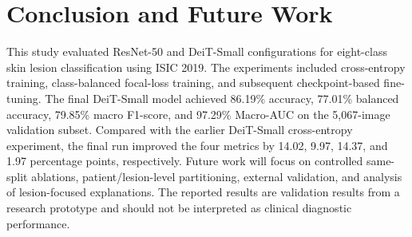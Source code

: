 \documentclass[conference]{IEEEtran}
\begin{document}
\section{Conclusion and Future Work}
This study evaluated ResNet-50 and DeiT-Small configurations for eight-class skin lesion classification using ISIC 2019. The experiments included cross-entropy training, class-balanced focal-loss training, and subsequent checkpoint-based fine-tuning. The final DeiT-Small model achieved 86.19\% accuracy, 77.01\% balanced accuracy, 79.85\% macro F1-score, and 97.29\% Macro-AUC on the 5,067-image validation subset. Compared with the earlier DeiT-Small cross-entropy experiment, the final run improved the four metrics by 14.02, 9.97, 14.37, and 1.97 percentage points, respectively. Future work will focus on controlled same-split ablations, patient/lesion-level partitioning, external validation, and analysis of lesion-focused explanations. The reported results are validation results from a research prototype and should not be interpreted as clinical diagnostic performance.
\end{document}
